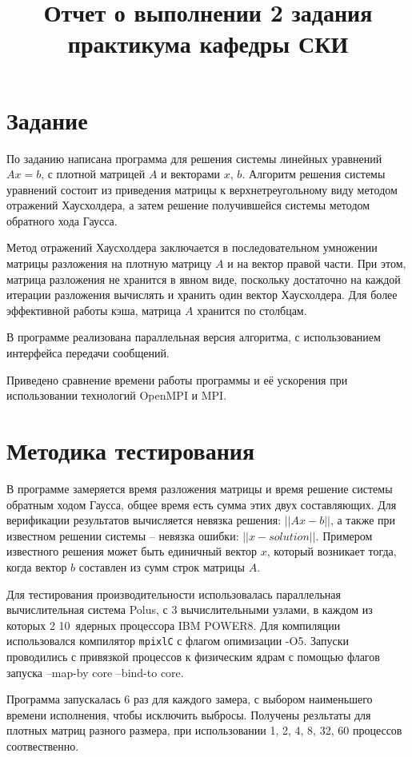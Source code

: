 \documentclass[12pt, oneside, a4paper]{article}
\begin{document}
\title{Отчет о выполнении 2 задания практикума кафедры СКИ}

\section{Задание}

По заданию написана программа для решения системы линейных уравнений $Ax = b$, с плотной матрицей $A$ и векторами $x$, $b$. Алгоритм решения системы уравнений состоит из приведения матрицы к верхнетреугольному виду методом отражений Хаусхолдера, а затем решение получившейся системы методом обратного хода Гаусса.

Метод отражений Хаусхолдера заключается в последовательном умножении матрицы разложения на плотную матрицу $A$ и на вектор правой части. При этом, матрица разложения не хранится в явном виде, поскольку достаточно на каждой итерации разложения вычислять и хранить один вектор Хаусхолдера. Для более эффективной работы кэша, матрица $A$ хранится по столбцам.

В программе реализована параллельная версия алгоритма, с использованием интерфейса передачи сообщений.

Приведено сравнение времени работы программы и её ускорения при использовании технологий OpenMPI и MPI.

\section{Методика тестирования}

В программе замеряется время разложения матрицы и время решение системы обратным ходом Гаусса, общее время есть сумма этих двух составляющих. Для верификации результатов вычисляется невязка решения: $||Ax - b||$, а также при известном решении системы -- невязка ошибки: $||x - solution||$. Примером известного решения может быть единичный вектор $x$, который возникает тогда, когда вектор $b$ составлен из сумм строк матрицы $A$.

Для тестирования производительности использовалась параллельная вычислительная система Polus, с 3 вычислительными узлами, в каждом из которых 2 10~ядерных процессора IBM POWER8. Для компиляции использовался компилятор \texttt{mpixlC} с флагом опимизации -O5. Запуски проводились с привязкой процессов к физическим ядрам с помощью флагов запуска --map-by core --bind-to core.

Программа запускалась 6 раз для каждого замера, с выбором наименьшего времени исполнения, чтобы исключить выбросы. Получены резльтаты для плотных матриц разного размера, при использовании 1, 2, 4, 8, 32, 60 процессов соотвественно.
\end{document}
